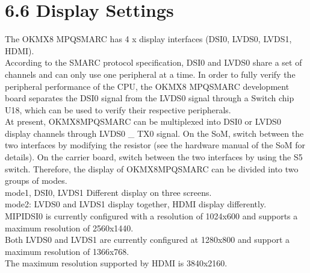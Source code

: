 \documentclass[letterpaper,10pt,openany,english]{sphinxmanual}
\begin{document}
\section{6.6 Display Settings}
\label{\detokenize{linux-manual:display-settings}}
\sphinxAtStartPar
The OK\sphinxhyphen{}MX8 MPQ\sphinxhyphen{}SMARC has 4 x display interfaces (DSI0, LVDS0, LVDS1, HDMI).\\
According to the SMARC protocol specification, DSI0 and LVDS0 share a set of channels and can only use one peripheral at a time. In order to fully verify the peripheral performance of the CPU, the OK\sphinxhyphen{}MX8 MPQ\sphinxhyphen{}SMARC development board separates the DSI0 signal from the LVDS0 signal through a Switch chip U18, which can be used to verify their respective peripherals.\\
At present, OK\sphinxhyphen{}MX8MPQ\sphinxhyphen{}SMARC can be multiplexed into DSI0 or LVDS0 display channels through LVDS0 \_ TX0 signal. On the SoM, switch between the two interfaces by modifying the resistor (see the hardware manual of the SoM for details). On the carrier board, switch between the two interfaces by using the S5 switch. Therefore, the display of OK\sphinxhyphen{}MX8MPQ\sphinxhyphen{}SMARC can be divided into two groups of modes.\\
mode1, DSI0, LVDS1 Different display on three screens.\\
mode2: LVDS0 and LVDS1 display together, HDMI display differently.\\
MIPIDSI0 is currently configured with a resolution of 1024x600 and supports a maximum resolution of 2560x1440.\\
Both LVDS0 and LVDS1 are currently configured at 1280x800 and support a maximum resolution of 1366x768.\\
The maximum resolution supported by HDMI is 3840x2160.
\end{document}
